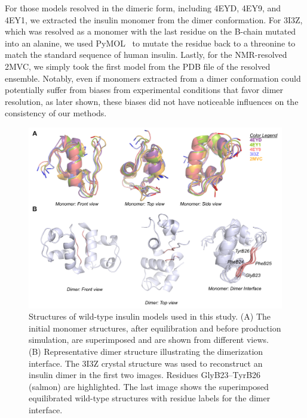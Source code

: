 \documentclass[9pt]{elife}
\begin{document}
For those models resolved in the dimeric form, including 4EYD, 4EY9, and 4EY1, we extracted the insulin monomer from the dimer conformation. For 3I3Z, which was resolved as a monomer with the last residue on the B-chain mutated into an alanine, we used PyMOL~\cite{delano2002pymol} to mutate the residue back to a threonine to match the standard sequence of human insulin. Lastly, for the NMR-resolved 2MVC, we simply took the first model from the PDB file of the resolved ensemble. Notably, even if monomers extracted from a dimer conformation could potentially suffer from biases from experimental conditions that favor dimer resolution, as later shown, these biases did not have noticeable influences on the consistency of our methods. 

\begin{figure}[H]
\centering
\includegraphics[width=\textwidth]{Figures/Fig_WTmodels_dimerInterface.png}
\caption{Structures of wild-type insulin models used in this study. (A) The initial monomer structures, after equilibration and before production simulation, are superimposed and are shown from different views. (B) Representative dimer structure illustrating the dimerization interface. The 3I3Z crystal structure was used to reconstruct an insulin dimer in the first two images. Residues GlyB23--TyrB26 (salmon) are highlighted. The last image shows the superimposed equilibrated wild-type structures with residue labels for the dimer interface.}
\label{starting_structures}
\end{figure}
\end{document}
